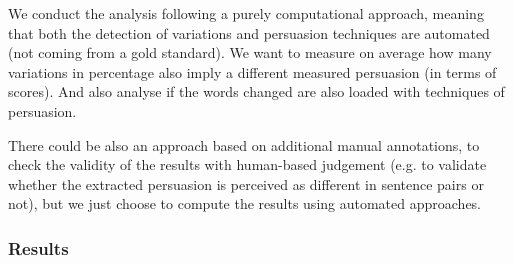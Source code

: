 We conduct the analysis following a purely computational approach, meaning that both the detection of variations and persuasion techniques are automated (not coming from a gold standard).
%
We want to measure on average how many variations in percentage also imply a different measured persuasion (in terms of scores). %
And also analyse if the words changed are also loaded with techniques of persuasion.

There could be also an approach based on additional manual annotations, to check the validity of the results with human-based judgement (e.g. to validate whether the extracted persuasion is perceived as different in sentence pairs or not), but we just choose to compute the results using automated approaches.



\subsubsection{Results}
\label{ssec:lp_relationship_small_variations_quant}

